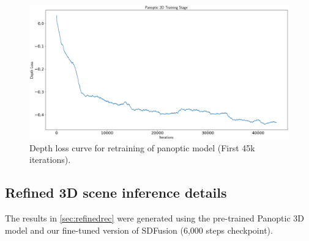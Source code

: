 \begin{figure}[h]
  \centering
  \includegraphics[width=\linewidth]{figs/depthloss.png}
  \caption{Depth loss curve for retraining of panoptic model (First 45k iterations).}
  \label{subfig:additional}
  \vspace*{-3mm} %
\end{figure}

\subsection{Refined 3D scene inference details}
The results in \cref{sec:refinedrec} were generated using the pre-trained Panoptic 3D model and our fine-tuned version of SDFusion (6,000 steps checkpoint). 